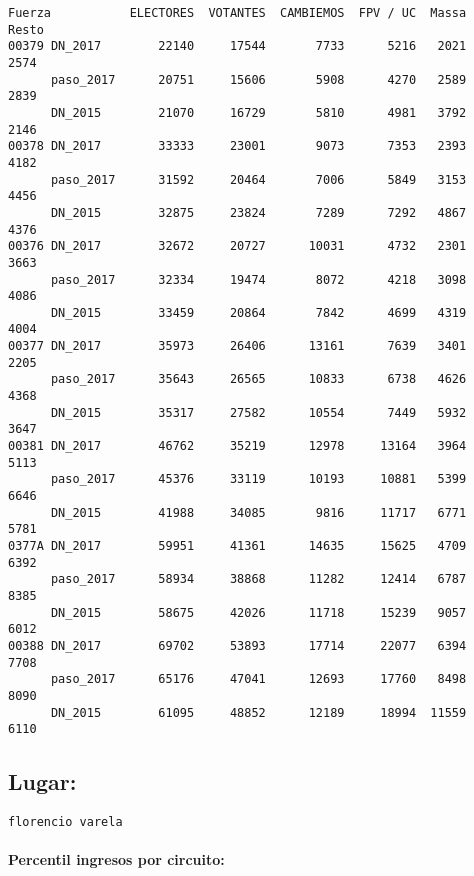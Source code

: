 \documentclass[11pt]{article}
\begin{document}
    \begin{verbatim}
Fuerza           ELECTORES  VOTANTES  CAMBIEMOS  FPV / UC  Massa  Resto
00379 DN_2017        22140     17544       7733      5216   2021   2574
      paso_2017      20751     15606       5908      4270   2589   2839
      DN_2015        21070     16729       5810      4981   3792   2146
00378 DN_2017        33333     23001       9073      7353   2393   4182
      paso_2017      31592     20464       7006      5849   3153   4456
      DN_2015        32875     23824       7289      7292   4867   4376
00376 DN_2017        32672     20727      10031      4732   2301   3663
      paso_2017      32334     19474       8072      4218   3098   4086
      DN_2015        33459     20864       7842      4699   4319   4004
00377 DN_2017        35973     26406      13161      7639   3401   2205
      paso_2017      35643     26565      10833      6738   4626   4368
      DN_2015        35317     27582      10554      7449   5932   3647
00381 DN_2017        46762     35219      12978     13164   3964   5113
      paso_2017      45376     33119      10193     10881   5399   6646
      DN_2015        41988     34085       9816     11717   6771   5781
0377A DN_2017        59951     41361      14635     15625   4709   6392
      paso_2017      58934     38868      11282     12414   6787   8385
      DN_2015        58675     42026      11718     15239   9057   6012
00388 DN_2017        69702     53893      17714     22077   6394   7708
      paso_2017      65176     47041      12693     17760   8498   8090
      DN_2015        61095     48852      12189     18994  11559   6110
    \end{verbatim}

    
    \hypertarget{lugar}{%
\subsection{Lugar:}\label{lugar}}

    
    \begin{Verbatim}[commandchars=\\\{\}]
florencio varela

    \end{Verbatim}

    \hypertarget{percentil-ingresos-por-circuito}{%
\paragraph{Percentil ingresos por
circuito:}\label{percentil-ingresos-por-circuito}}
\end{document}

